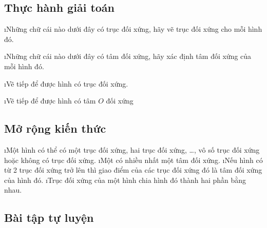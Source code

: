 \subsection{Thực hành giải toán}
\begin{vd}
	\begin{enumerate}[a), leftmargin=*]
		\i Những chữ cái nào dưới đây có trục đối xứng, hãy vẽ trục đối xứng cho mỗi hình đó.
		
		\i Những chữ cái nào dưới đây có tâm đối xứng, hãy xác định tâm đối xứng của mỗi hình đó.
	\end{enumerate}
\end{vd}
\begin{vd}
	\begin{enumerate}[a), leftmargin=*]
		\i Vẽ tiếp để được hình có trục đối xứng.  
		
		\i Vẽ tiếp để được hình có tâm $O$ đối xứng 
	\end{enumerate}
	\loigiai{
		\begin{enumerate}[a), leftmargin=*]
			\i
			\i
		\end{enumerate}
	}
\end{vd}
\subsection{Mở rộng kiến thức}
\begin{enumerate}[--, leftmargin=*]
	\i Một hình có thể có một trục đối xứng, hai trục đối xứng, \ldots, vô số trục đối xứng hoặc không có trục đối xứng.
	\i Một có nhiều nhất một tâm đối xứng.
	\i Nếu hình có từ 2 trục đối xứng trở lên thì giao điểm của các trục đối xứng đó là tâm đối xứng của hình đó.
	\i Trục đối xứng của một hình chia hình đó thành hai phần bằng nhau.
\end{enumerate}
\subsection{Bài tập tự luyện}
